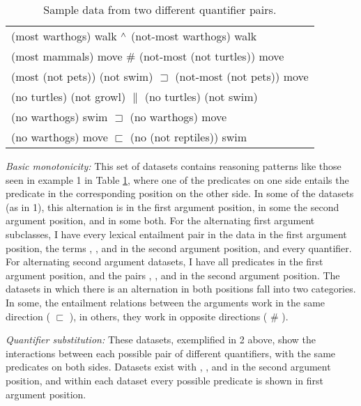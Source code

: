 \begin{table}\small\centering
\begin{tabular}{|l|}
\hline
(most warthogs) walk $\mathbin{^{\wedge}}$ (not-most warthogs) walk\\
(most mammals) move \# (not-most (not turtles)) move\\
(most (not pets)) (not swim) $\sqsupset$ (not-most (not pets)) move\\
\hline
(no turtles) (not growl) $\|$ (no turtles) (not swim)\\
(no warthogs) swim $\sqsupset$ (no warthogs) move\\
(no warthogs) move $\sqsubset$ (no (not reptiles)) swim\\
\hline
\end{tabular}
\caption{Sample data from two different quantifier pairs.\label{examplesofdata}}
\end{table}



\noindent\textit{Basic monotonicity:} This set of datasets contains reasoning patterns like those seen in example 1  in Table \ref{examplesofdata}, where one of the predicates on one side entails the predicate in the corresponding position on the other side. In some of the datasets (as in 1), this alternation is in the first argument position, in some the second argument position, and in some both. For the alternating first argument subclasses, I have every lexical entailment pair in the data in the first argument position, the terms , , and  in the second argument position, and every quantifier. 
For alternating second argument datasets, I have all predicates in the first argument position, and the pairs , , and  in the second argument position. The datasets in which there is an alternation in both positions fall into two categories. In some, the entailment relations between the arguments work in the same direction ( $\sqsubset$ ), in others, they work in opposite directions ( \# ).

\noindent\textit{Quantifier substitution:} These datasets, exemplified in 2 above, show the interactions between each possible pair of different quantifiers, with the same predicates on both sides. Datasets exist with , , and  in the second argument position, and within each dataset every possible predicate is shown in first argument position.

